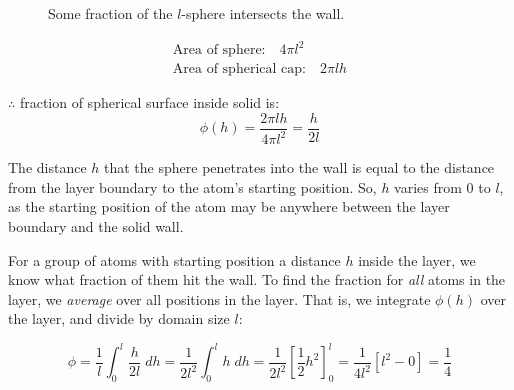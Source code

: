 \documentclass[12pt, a4paper, twoside, openright]{book}
\begin{document}
\begin{figure}[ht]
\centering
{}
\caption{Some fraction of the $l$-sphere intersects the wall.}\label{sphereintersect}
\end{figure}

\begin{align*}
\text{Area of sphere:} \quad 4 \pi l^2 \\
\text{Area of spherical cap:} \quad 2 \pi l h
\end{align*}

$\therefore$ fraction of spherical surface inside solid is:
\begin{equation}
\phi(h) = \frac{2 \pi l h}{4 \pi l^{2}} = \frac{h}{2l}
\end{equation}

The distance $h$ that the sphere penetrates into the wall is equal to the distance from the layer boundary to the atom's starting position.  So, $h$ varies from 0 to $l$, as the starting position of the atom may be anywhere between the layer boundary and the solid wall.

For a group of atoms with starting position a distance $h$ inside the layer, we know what fraction of them hit the wall.
To find the fraction for \emph{all} atoms in the layer, we \emph{average} over all positions in the layer. That is, we integrate $\phi(h)$ over the layer, and divide by domain size $l$:

\begin{equation}
\phi = \frac{1}{l}\int_{0}^{l} \frac{h}{2l} \; dh = \frac{1}{2l^{2}} \int_{0}^{l} h \;dh = 
\frac{1}{2l^{2}} [\frac{1}{2} h^{2}]_{0}^{l} =
\frac{1}{4l^{2}}[l^{2} - 0] = \frac{1}{4}
\end{equation}
\end{document}
